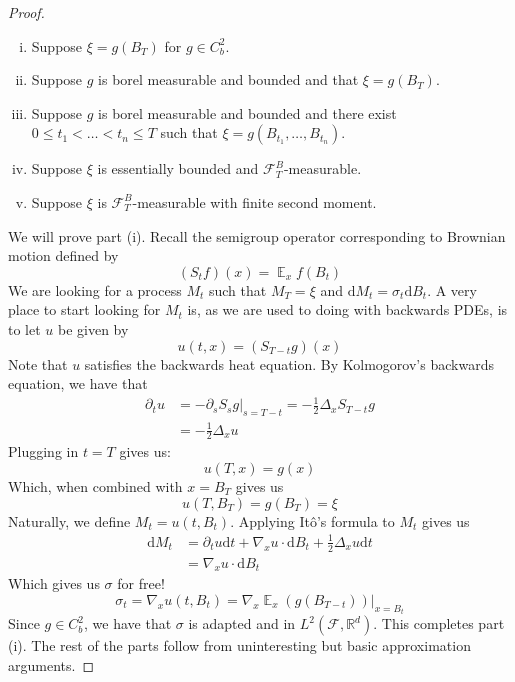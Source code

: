 \documentclass{amsart}
\newcommand{\rr}{\mathbb R}    %
\newcommand{\cF}{\mathcal{F}}
\DeclareMathOperator{\ee}{\mathbb E}
\theoremstyle{definition}
\theoremstyle{remark}
\numberwithin{equation}{section}
\begin{document}
\begin{proof}
    \begin{enumerate}[i)]
        \item Suppose $\xi = g(B_T)$ for $g \in C^2_b$.
        \item Suppose $g$ is borel measurable and bounded and that $\xi = g(B_T)$.
        \item Suppose $g$ is borel measurable and bounded and there exist $0 \le t_1 < \ldots < t_n \le T$ such that $\xi = g(B_{t_1}, \ldots, B_{t_n})$.
        \item Suppose $\xi$ is essentially bounded and $\cF_T^B$-measurable.
        \item Suppose $\xi$ is $\cF_T^B$-measurable with finite second moment.
    \end{enumerate}
    We will prove part (i). Recall the semigroup operator corresponding to Brownian motion defined by
    \begin{equation}
        (S_t f)(x) = \ee_x f(B_t)
    \end{equation}
    We are looking for a process $M_t$ such that $M_T = \xi$ and $\mathrm{d}M_t = \sigma_t \mathrm{d}B_t$. A very place to start looking for $M_t$ is, as we are used to doing with backwards PDEs, is to let $u$ be given by
    \begin{equation}
        u(t, x) = (S_{T-t} g)(x)
    \end{equation}
    Note that $u$ satisfies the backwards heat equation. By Kolmogorov's backwards equation, we have that
    \begin{align*}
        \partial_t u &= - \partial_s S_{s} g |_{s = T-t} = - \frac{1}{2} \Delta_x S_{T-t} g \\
        &= - \frac{1}{2} \Delta_x u
    \end{align*}
    Plugging in $t = T$ gives us:
    \[
    u(T, x) = g(x)
    \]
    Which, when combined with $x = B_T$ gives us 
    \[
    u(T, B_T) = g(B_T) = \xi
    \]
    Naturally, we define $M_t = u(t, B_t)$. Applying It\^o's formula to $M_t$ gives us
    \begin{align*}
        \mathrm{d} M_t &= \partial_t u \mathrm{d} t + \nabla_x u \cdot \mathrm{d}B_t + \frac{1}{2} \Delta_x u \mathrm{d}t \\
        &= \nabla_x u \cdot \mathrm{d}B_t
    \end{align*}
    Which gives us $\sigma$ for free!
    \begin{equation}
        \sigma_t = \nabla_x u(t, B_t) = \nabla_x \ee_x (g(B_{T-t})) |_{x = B_t}
    \end{equation}
    Since $g \in C^2_b$, we have that $\sigma$ is adapted and in $L^2(\cF, \rr^d)$. This completes part (i).
    The rest of the parts follow from uninteresting but basic approximation arguments.
\end{proof}
\end{document}
